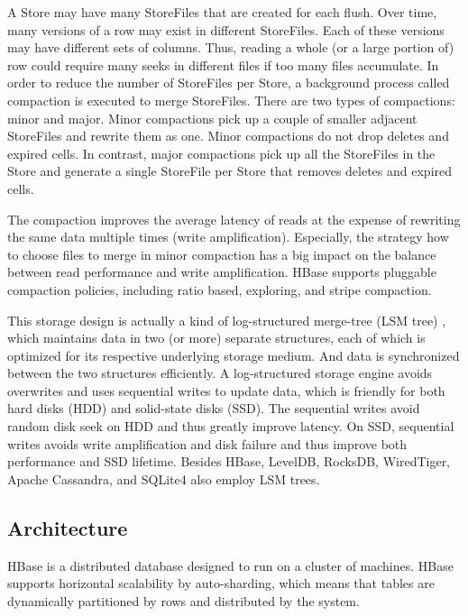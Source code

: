\documentclass[12pt]{book}
\begin{document}
A Store may have many StoreFiles that are created for each flush. Over time, many versions of a row may exist in different StoreFiles. Each of these versions may have different sets of columns. Thus, reading a whole (or a large portion of) row could require many seeks in different files if too many files accumulate. In order to reduce the number of StoreFiles per Store, a background process called compaction is executed to merge StoreFiles. There are two types of compactions: minor and major. Minor compactions pick up a couple of smaller adjacent StoreFiles and rewrite them as one. Minor compactions do not drop deletes and expired cells. In contrast, major compactions pick up all the StoreFiles in the Store and generate a single StoreFile per Store that removes deletes and expired cells.

The compaction improves the average latency of reads at the expense of rewriting the same data multiple times (write amplification). Especially, the strategy how to choose files to merge in minor compaction has a big impact on the balance between read performance and write amplification. HBase supports pluggable compaction policies, including ratio based, exploring, and stripe compaction.

This storage design is actually a kind of log-structured merge-tree (LSM tree) \cite{O'Neil96thelog-structured}, which maintains data in two (or more) separate structures, each of which is optimized for its respective underlying storage medium. And data is synchronized between the two structures efficiently. A log-structured storage engine avoids overwrites and uses sequential writes to update data, which is friendly for both hard disks (HDD) and solid-state disks (SSD). The sequential writes avoid random disk seek on HDD and thus greatly improve latency. On SSD, sequential writes avoids write amplification and disk failure and thus improve both performance and SSD lifetime. Besides HBase,  LevelDB, RocksDB, WiredTiger, Apache Cassandra, and SQLite4 also employ LSM trees.

\subsection{Architecture}

HBase is a distributed database designed to run on a cluster of machines. HBase supports horizontal scalability by auto-sharding, which means that tables are dynamically partitioned by rows and distributed by the system. 
\end{document}
